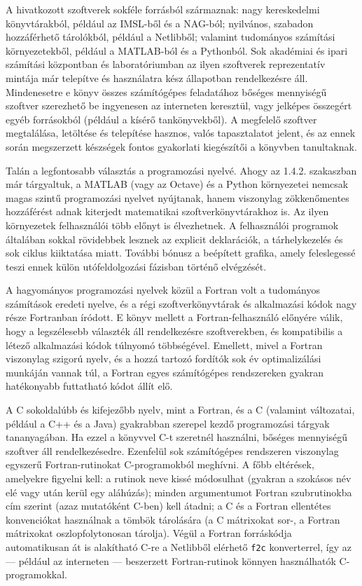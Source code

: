 \documentclass[
  magyar,
  11pt]{article}
\begin{document}
A hivatkozott szoftverek sokféle forrásból származnak: nagy kereskedelmi
könyvtárakból, például az IMSL-ből és a NAG-ból; nyilvános, szabadon
hozzáférhető tárolókból, például a Netlibből; valamint tudományos
számítási környezetekből, például a MATLAB-ból és a Pythonból. Sok
akadémiai és ipari számítási központban és laboratóriumban az ilyen
szoftverek reprezentatív mintája már telepítve és használatra kész
állapotban rendelkezésre áll. Mindenesetre e könyv összes számítógépes
feladatához bőséges mennyiségű szoftver szerezhető be ingyenesen az
interneten keresztül, vagy jelképes összegért egyéb forrásokból (például
a kísérő tankönyvekből). A megfelelő szoftver megtalálása, letöltése és
telepítése hasznos, valós tapasztalatot jelent, és az ennek során
megszerzett készségek fontos gyakorlati kiegészítői a könyvben
tanultaknak.

Talán a legfontosabb választás a programozási nyelvé. Ahogy az 1.4.2.
szakaszban már tárgyaltuk, a MATLAB (vagy az Octave) és a Python
környezetei nemcsak magas szintű programozási nyelvet nyújtanak, hanem
viszonylag zökkenőmentes hozzáférést adnak kiterjedt matematikai
szoftverkönyvtárakhoz is. Az ilyen környezetek felhasználói több előnyt
is élvezhetnek. A felhasználói programok általában sokkal rövidebbek
lesznek az explicit deklarációk, a tárhelykezelés és sok ciklus
kiiktatása miatt. További bónusz a beépített grafika, amely feleslegessé
teszi ennek külön utófeldolgozási fázisban történő elvégzését.

A hagyományos programozási nyelvek közül a Fortran volt a tudományos
számítások eredeti nyelve, és a régi szoftverkönyvtárak és alkalmazási
kódok nagy része Fortranban íródott. E könyv mellett a
Fortran-felhasználó előnyére válik, hogy a legszélesebb választék áll
rendelkezésre szoftverekben, és kompatibilis a létező alkalmazási kódok
túlnyomó többségével. Emellett, mivel a Fortran viszonylag szigorú
nyelv, és a hozzá tartozó fordítók sok év optimalizálási munkáján vannak
túl, a Fortran egyes számítógépes rendszereken gyakran hatékonyabb
futtatható kódot állít elő.

A C sokoldalúbb és kifejezőbb nyelv, mint a Fortran, és a C (valamint
változatai, például a C++ és a Java) gyakrabban szerepel kezdő
programozási tárgyak tananyagában. Ha ezzel a könyvvel C-t szeretnél
használni, bőséges mennyiségű szoftver áll rendelkezésedre. Ezenfelül
sok számítógépes rendszeren viszonylag egyszerű Fortran-rutinokat
C-programokból meghívni. A főbb eltérések, amelyekre figyelni kell: a
rutinok neve kissé módosulhat (gyakran a szokásos név elé vagy után
kerül egy aláhúzás); minden argumentumot Fortran szubrutinokba cím
szerint (azaz mutatóként C-ben) kell átadni; a C és a Fortran ellentétes
konvenciókat használnak a tömbök tárolására (a C mátrixokat sor-, a
Fortran mátrixokat oszlopfolytonosan tárolja). Végül a Fortran
forráskódja automatikusan át is alakítható C-re a Netlibből elérhető
\texttt{f2c} konverterrel, így az --- például az interneten ---
beszerzett Fortran-rutinok könnyen használhatók C-programokkal.
\end{document}
